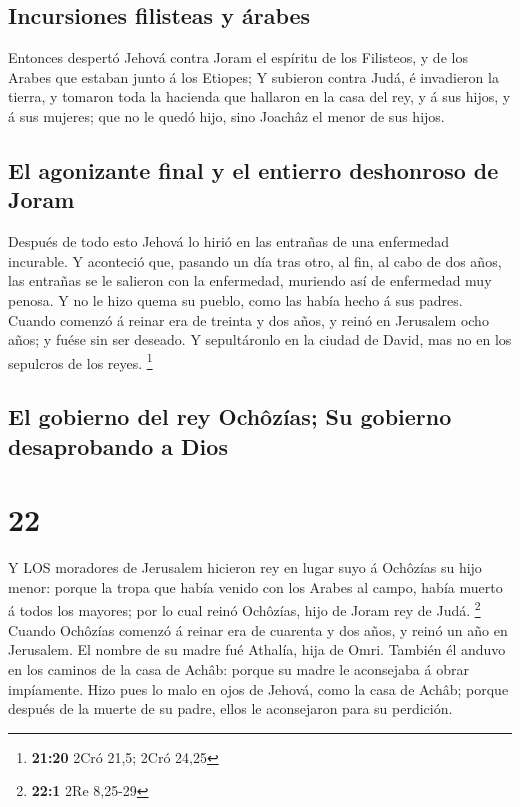 \hypertarget{incursiones-filisteas-y-uxe1rabes}{%
\subsection{Incursiones filisteas y
árabes}\label{incursiones-filisteas-y-uxe1rabes}}

 Entonces despertó Jehová contra Joram el espíritu de los
Filisteos, y de los Arabes que estaban junto á los Etiopes;
 Y subieron contra Judá, é invadieron la tierra, y tomaron
toda la hacienda que hallaron en la casa del rey, y á sus hijos, y á sus
mujeres; que no le quedó hijo, sino Joachâz el menor de sus hijos.

\hypertarget{el-agonizante-final-y-el-entierro-deshonroso-de-joram}{%
\subsection{El agonizante final y el entierro deshonroso de
Joram}\label{el-agonizante-final-y-el-entierro-deshonroso-de-joram}}

 Después de todo esto Jehová lo hirió en las entrañas de
una enfermedad incurable.  Y aconteció que, pasando un día
tras otro, al fin, al cabo de dos años, las entrañas se le salieron con
la enfermedad, muriendo así de enfermedad muy penosa. Y no le hizo quema
su pueblo, como las había hecho á sus padres.  Cuando
comenzó á reinar era de treinta y dos años, y reinó en Jerusalem ocho
años; y fuése sin ser deseado. Y sepultáronlo en la ciudad de David, mas
no en los sepulcros de los reyes. \footnote{\textbf{21:20} 2Cró 21,5;
  2Cró 24,25}

\hypertarget{el-gobierno-del-rey-ochuxf4zuxedas-su-gobierno-desaprobando-a-dios}{%
\subsection{El gobierno del rey Ochôzías; Su gobierno desaprobando a
Dios}\label{el-gobierno-del-rey-ochuxf4zuxedas-su-gobierno-desaprobando-a-dios}}

\hypertarget{section-21}{%
\section{22}\label{section-21}}

 Y LOS moradores de Jerusalem hicieron rey en lugar suyo á
Ochôzías su hijo menor: porque la tropa que había venido con los Arabes
al campo, había muerto á todos los mayores; por lo cual reinó Ochôzías,
hijo de Joram rey de Judá. \footnote{\textbf{22:1} 2Re 8,25-29}
 Cuando Ochôzías comenzó á reinar era de cuarenta y dos
años, y reinó un año en Jerusalem. El nombre de su madre fué Athalía,
hija de Omri.  También él anduvo en los caminos de la casa
de Achâb: porque su madre le aconsejaba á obrar impíamente. 
Hizo pues lo malo en ojos de Jehová, como la casa de Achâb; porque
después de la muerte de su padre, ellos le aconsejaron para su
perdición.

